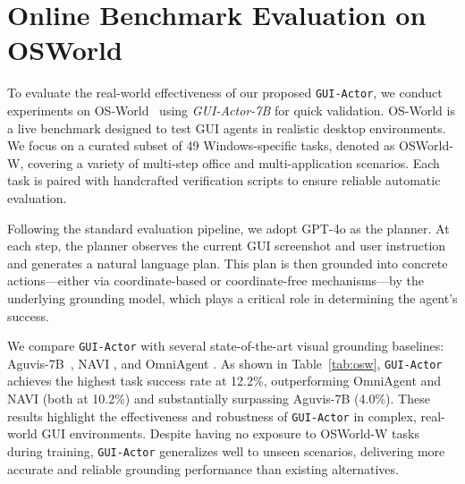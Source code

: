 \documentclass{article}
\newcommand{\sys}{\texttt{GUI-Actor}\xspace}
\begin{document}
% 
% 




\section{Online Benchmark Evaluation on OSWorld}
\label{sec:online_eva}

To evaluate the real-world effectiveness of our proposed \sys, we conduct experiments on OS-World~\citep{xie2024osworld} using \textit{GUI-Actor-7B} for quick validation. OS-World is a live benchmark designed to test GUI agents in realistic desktop environments. We focus on a curated subset of 49 Windows-specific tasks, denoted as OSWorld-W, covering a variety of multi-step office and multi-application scenarios. Each task is paired with handcrafted verification scripts to ensure reliable automatic evaluation.

Following the standard evaluation pipeline, we adopt GPT-4o as the planner. At each step, the planner observes the current GUI screenshot and user instruction and generates a natural language plan. This plan is then grounded into concrete actions—either via coordinate-based or coordinate-free mechanisms—by the underlying grounding model, which plays a critical role in determining the agent's success.

We compare \sys with several state-of-the-art visual grounding baselines: Aguvis-7B~\citep{xu2024aguvis}, NAVI \cite{bonatti2024windows}, and OmniAgent \cite{lu2024omniparser}. As shown in Table~\ref{tab:osw}, \sys achieves the highest task success rate at 12.2\%, outperforming OmniAgent and NAVI (both at 10.2\%) and substantially surpassing Aguvis-7B (4.0\%). These results highlight the effectiveness and robustness of \sys in complex, real-world GUI environments. Despite having no exposure to OSWorld-W tasks during training, \sys generalizes well to unseen scenarios, delivering more accurate and reliable grounding performance than existing alternatives.
\end{document}
